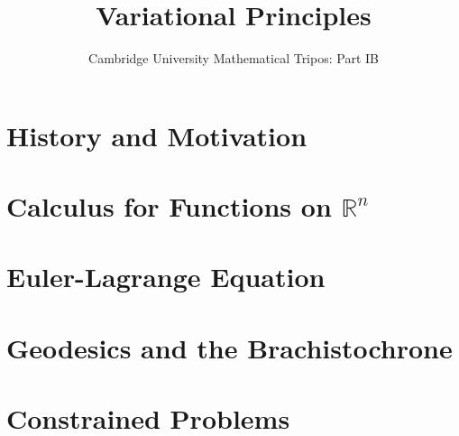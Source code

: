 \documentclass{article}
\title{Variational Principles}
\author{Cambridge University Mathematical Tripos: Part IB}
\begin{document}
\maketitle

\tableofcontentsnewpage{}

\section{History and Motivation}

\section{Calculus for Functions on \(\mathbb R^n\)}

\section{Euler-Lagrange Equation}

\section{Geodesics and the Brachistochrone}

\section{Constrained Problems}

\end{document}
